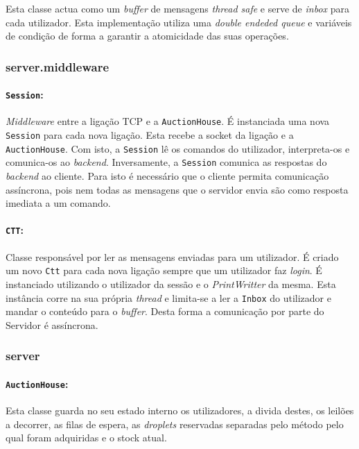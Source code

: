 \documentclass[a4paper]{article}
\begin{document}
Esta classe actua como um \textit{buffer} de mensagens \textit{thread safe} e serve de \textit{inbox} para cada utilizador. Esta implementação utiliza uma \textit{double endeded queue} e variáveis de condição de forma a garantir a atomicidade das suas operações. 

\subsubsection{server.middleware}
\paragraph{\texttt{Session}:}

\textit{Middleware} entre a ligação TCP e a \texttt{AuctionHouse}. É instanciada uma nova \texttt{Session} para cada nova ligação. Esta recebe a socket da ligação e a \texttt{AuctionHouse}. Com isto, a \texttt{Session} lê os comandos do utilizador, interpreta-os e comunica-os ao \textit{backend}. Inversamente, a \texttt{Session} comunica as respostas do \textit{backend} ao cliente. Para isto é necessário que o cliente permita comunicação assíncrona, pois nem todas as mensagens que o servidor envia são como resposta imediata a um comando.

\paragraph{\texttt{CTT}:}

Classe responsável por ler as mensagens enviadas para um utilizador. É criado um novo \texttt{Ctt} para cada nova ligação sempre que um utilizador faz \textit{login}. É instanciado utilizando o utilizador da sessão e o \textit{PrintWritter} da mesma. Esta instância corre na sua própria \textit{thread} e limita-se a ler a \texttt{Inbox} do utilizador e mandar o conteúdo para o \textit{buffer}. Desta forma a comunicação por parte do Servidor é assíncrona. 

\subsubsection{server}
\paragraph{\texttt{AuctionHouse}:}

Esta classe guarda no seu estado interno os utilizadores, a divida destes, os leilões a decorrer, as filas de espera, as \textit{droplets} reservadas separadas pelo método pelo qual foram adquiridas e o stock atual.
\end{document}
